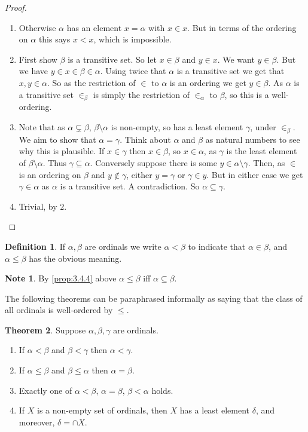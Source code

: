 \documentclass{article}
\theoremstyle{definition}\newtheorem{definition}{Definition}[subsection]
\theoremstyle{definition}\newtheorem{remark}[definition]{Remark}
\theoremstyle{definition}\newtheorem*{example}{Example}
\theoremstyle{definition}\newtheorem*{note}{Note}
\newtheorem{theorem}[definition]{Theorem}
\begin{document}
\begin{proof}
\hfill
\begin{enumerate}
\item Otherwise $ \alpha $ has an element $ x = \alpha $ with $ x \in x $. But in terms of the ordering on $ \alpha $ this says $ x < x $, which is impossible.
\item First show $ \beta $ is a transitive set. So let $ x \in \beta $ and $ y \in x $. We want $ y \in \beta $. But we have $ y \in x \in \beta \in \alpha $. Using twice that $ \alpha $ is a transitive set we get that $ x, y \in \alpha $. So as the restriction of $ \in $ to $ \alpha $ is an ordering we get $ y \in \beta $. As $ \alpha $ is a transitive set $ \in_\beta $ is simply the restriction of $ \in_\alpha $ to $ \beta $, so this is a well-ordering.
\item Note that as $ \alpha \subsetneq \beta $, $ \beta \setminus \alpha $ is non-empty, so has a least element $ \gamma $, under $ \in_\beta $. We aim to show that $ \alpha = \gamma $. Think about $ \alpha $ and $ \beta $ as natural numbers to see why this is plausible. If $ x \in \gamma $ then $ x \in \beta $, so $ x \in \alpha $, as $ \gamma $ is the least element of $ \beta \setminus \alpha $. Thus $ \gamma \subseteq \alpha $. Conversely suppose there is some $ y \in \alpha \setminus \gamma $. Then, as $ \in $ is an ordering on $ \beta $ and $ y \notin \gamma $, either $ y = \gamma $ or $ \gamma \in y $. But in either case we get $ \gamma \in \alpha $ as $ \alpha $ is a transitive set. A contradiction. So $ \alpha \subseteq \gamma $.
\item Trivial, by $ 2 $.
\end{enumerate}
\end{proof}

\begin{definition}
If $ \alpha, \beta $ are ordinals we write $ \alpha < \beta $ to indicate that $ \alpha \in \beta $, and $ \alpha \le \beta $ has the obvious meaning.
\end{definition}

\begin{note}
By \ref{prop:3.4.4} above $ \alpha \le \beta $ iff $ \alpha \subseteq \beta $.
\end{note}

The following theorems can be paraphrased informally as saying that the class of all ordinals is well-ordered by $ \le $.

\begin{theorem}
\label{thm:3.4.6}
Suppose $ \alpha, \beta, \gamma $ are ordinals.
\begin{enumerate}
\item If $ \alpha < \beta $ and $ \beta < \gamma $ then $ \alpha < \gamma $.
\item If $ \alpha \le \beta $ and $ \beta \le \alpha $ then $ \alpha = \beta $.
\item Exactly one of $ \alpha < \beta $, $ \alpha = \beta $, $ \beta < \alpha $ holds.
\item If $ X $ is a non-empty set of ordinals, then $ X $ has a least element $ \delta $, and moreover, $ \delta = \cap X $.
\end{enumerate}
\end{theorem}
\end{document}
